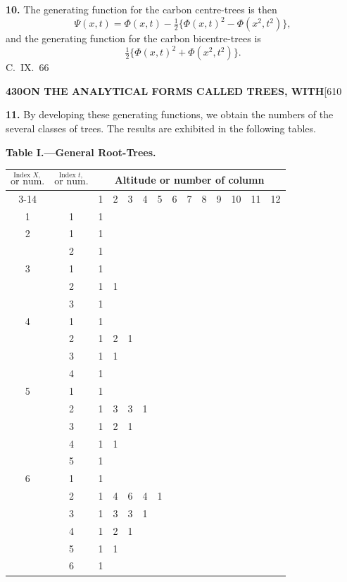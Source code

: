 \documentclass[11pt,a4paper]{article}
\begin{document}
{\medskip
\noindent\textbf{10.}
The generating function for the carbon centre-trees is then
\[
\Psi(x,t) = \Phi(x,t) - \tfrac{1}{2}\{\Phi(x,t)^2 - \Phi(x^2,t^2)\},
\]
and the generating function for the carbon bicentre-trees is
\[
\tfrac{1}{2}\{\Phi(x,t)^2 + \Phi(x^2,t^2)\}.
\]
\hfill C.~IX.\ 66

\newpage
\noindent\textbf{430}\hspace{\fill}\textbf{ON THE ANALYTICAL FORMS CALLED TREES, WITH}\hspace{\fill}[610

\noindent\textbf{11.}
By developing these generating functions, we obtain the numbers of the several classes of trees. The results are exhibited in the following tables.

\medskip
\noindent\textbf{Table I.---General Root-Trees.}

\begin{center}
\small
\begin{longtable}{|c|c|*{12}{c|}}
\hline
\multirow{2}{*}{$\stackrel{\text{Index }X,}{\text{or num.}}$} &
\multirow{2}{*}{$\stackrel{\text{Index }t,}{\text{or num.}}$} &
\multicolumn{12}{c|}{Altitude or number of column} \\
\cline{3-14}
& & 1 & 2 & 3 & 4 & 5 & 6 & 7 & 8 & 9 & 10 & 11 & 12 \\
\hline
\endfirsthead
\hline
1 & 1 & 1 & & & & & & & & & & & \\
\hline
2 & 1 & 1 & & & & & & & & & & & \\
  & 2 & 1 & & & & & & & & & & & \\
\hline
3 & 1 & 1 & & & & & & & & & & & \\
  & 2 & 1 & 1 & & & & & & & & & & \\
  & 3 & 1 & & & & & & & & & & & \\
\hline
4 & 1 & 1 & & & & & & & & & & & \\
  & 2 & 1 & 2 & 1 & & & & & & & & & \\
  & 3 & 1 & 1 & & & & & & & & & & \\
  & 4 & 1 & & & & & & & & & & & \\
\hline
5 & 1 & 1 & & & & & & & & & & & \\
  & 2 & 1 & 3 & 3 & 1 & & & & & & & & \\
  & 3 & 1 & 2 & 1 & & & & & & & & & \\
  & 4 & 1 & 1 & & & & & & & & & & \\
  & 5 & 1 & & & & & & & & & & & \\
\hline
6 & 1 & 1 & & & & & & & & & & & \\
  & 2 & 1 & 4 & 6 & 4 & 1 & & & & & & & \\
  & 3 & 1 & 3 & 3 & 1 & & & & & & & & \\
  & 4 & 1 & 2 & 1 & & & & & & & & & \\
  & 5 & 1 & 1 & & & & & & & & & & \\
  & 6 & 1 & & & & & & & & & & & \\
\hline
\end{longtable}
\end{center}

}
\end{document}
